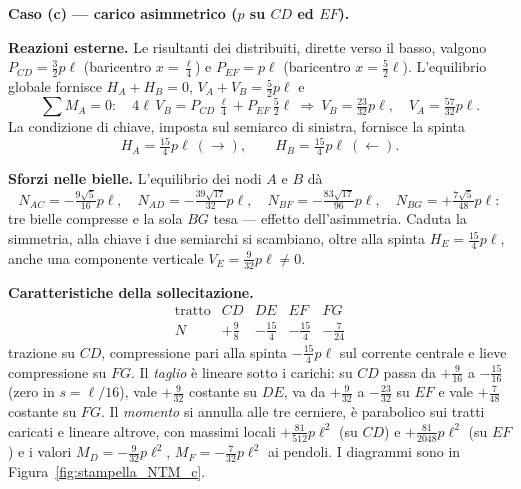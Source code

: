 \begin{esercizio}
\begin{svolgimento}
	
	\medskip\noindent\textbf{Caso (c) --- carico asimmetrico ($p$ su $CD$ ed $EF$).}
	\nopagebreak
	
	\medskip\noindent\textbf{Reazioni esterne.}
	Le risultanti dei distribuiti, dirette verso il basso, valgono
	$P_{CD}=\tfrac32 p\ell$ (baricentro $x=\tfrac{\ell}{4}$) e $P_{EF}=p\ell$
	(baricentro $x=\tfrac52\ell$). L'equilibrio globale fornisce $H_A+H_B=0$,
	$V_A+V_B=\tfrac52 p\ell$ e
	\[
	\textstyle\sum M_A=0:\quad 4\ell\,V_B=P_{CD}\,\tfrac{\ell}{4}+P_{EF}\,\tfrac52\ell
	\ \Rightarrow\ V_B=\tfrac{23}{32}p\ell,\quad V_A=\tfrac{57}{32}p\ell.
	\]
	La condizione di chiave, imposta sul semiarco di sinistra, fornisce la spinta
	\[
	H_A=\tfrac{15}{4}p\ell\ (\rightarrow),\qquad H_B=\tfrac{15}{4}p\ell\ (\leftarrow).
	\]
	
	\medskip\noindent\textbf{Sforzi nelle bielle.}
	L'equilibrio dei nodi $A$ e $B$ dà
	\[
	N_{AC}=-\tfrac{9\sqrt5}{16}p\ell,\quad N_{AD}=-\tfrac{39\sqrt{17}}{32}p\ell,\quad
	N_{BF}=-\tfrac{83\sqrt{17}}{96}p\ell,\quad N_{BG}=+\tfrac{7\sqrt5}{48}p\ell:
	\]
	tre bielle compresse e la sola $BG$ tesa --- effetto dell'asimmetria. Caduta
	la simmetria, alla chiave i due semiarchi si scambiano, oltre alla spinta
	$H_E=\tfrac{15}{4}p\ell$, anche una componente verticale
	$V_E=\tfrac{9}{32}p\ell\neq0$.
	
	\medskip\noindent\textbf{Caratteristiche della sollecitazione.}
	\[
	\begin{array}{l|cccc}
		\text{tratto} & CD & DE & EF & FG\\\hline
		N & +\tfrac98 & -\tfrac{15}{4} & -\tfrac{15}{4} & -\tfrac{7}{24}
	\end{array}
	\]
	trazione su $CD$, compressione pari alla spinta $-\tfrac{15}{4}p\ell$ sul
	corrente centrale e lieve compressione su $FG$. Il \emph{taglio} è lineare
	sotto i carichi: su $CD$ passa da $+\tfrac{9}{16}$ a $-\tfrac{15}{16}$ (zero
	in $s=\ell/16$), vale $+\tfrac{9}{32}$ costante su $DE$, va da
	$+\tfrac{9}{32}$ a $-\tfrac{23}{32}$ su $EF$ e vale $+\tfrac{7}{48}$ costante
	su $FG$. Il \emph{momento} si annulla alle tre cerniere, è parabolico sui
	tratti caricati e lineare altrove, con massimi locali $+\tfrac{81}{512}p\ell^2$
	(su $CD$) e $+\tfrac{81}{2048}p\ell^2$ (su $EF$) e i valori
	$M_D=-\tfrac{9}{32}p\ell^2$, $M_F=-\tfrac{7}{32}p\ell^2$ ai pendoli. I
	diagrammi sono in Figura~\ref{fig:stampella_NTM_c}.
	


\end{svolgimento}
\end{esercizio}
